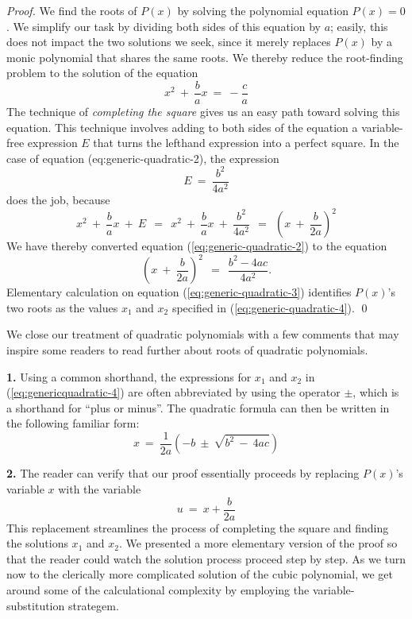 \begin{proof}
We find the roots of $P(x)$ by solving the polynomial equation $P(x) = 0$.  We simplify our task by dividing both sides of this equation by $a$; easily, this does not impact the two solutions we seek, since it merely replaces $P(x)$ by a monic polynomial that shares the same roots.  We thereby reduce the root-finding problem to the solution of the equation
\begin{equation}
\label{eq:generic-quadratic-2}
x^2 \ + \ \frac{b}{a} x \ = \ - \frac{c}{a}
\end{equation}
The technique of {\it completing the square} gives us an easy path toward solving this equation.  This technique involves adding to both sides of the equation a variable-free expression $E$ that turns the lefthand expression into a perfect square.  In the case of equation ({eq:generic-quadratic-2}), the expression
\[ E \ = \ \frac{b^2}{4a^2} \]
does the job, because
\[
x^2 \ + \ \frac{b}{a} x \ + \ E \ \ = \ \
x^2 \ + \ \frac{b}{a} x \ + \ \frac{b^2}{4a^2}
   \ \ = \ \ \left( x \ + \ \frac{b}{2a} \right)^2
\]
We have thereby converted equation (\ref{eq:generic-quadratic-2}) to
the equation
\begin{equation}
\label{eq:generic-quadratic-3}
\left( x \ + \ \frac{b}{2a} \right)^2
 \ \ = \ \ \frac{b^2 - 4ac}{4a^2}.
\end{equation}
Elementary calculation on equation (\ref{eq:generic-quadratic-3}) identifies $P(x)$'s two roots as the values $x_1$ and $x_2$ specified in (\ref{eq:generic-quadratic-4}).  \qed
\end{proof}

\bigskip

\noindent
We close our treatment of quadratic polynomials with a few comments that may inspire some readers to read further about roots of quadratic polynomials.


{\bf 1.}
Using a common shorthand, the expressions for $x_1$ and $x_2$ in (\ref{eq:genericquadratic-4}) are often abbreviated by using the operator $\pm$, which is a shorthand for ``plus or minus''.  The quadratic formula can then be written in the following familiar form:
\[
x \ = \  \frac{1}{2a} \left( -b \ \pm \ \sqrt{b^2 \ - \ 4ac} \right)
\]

\smallskip

{\bf 2.}
The reader can verify that our proof essentially proceeds by replacing $P(x)$'s variable $x$ with the variable
\[ u \ = \ x + \frac{b}{2a} \]
This replacement streamlines the process of completing the square and finding the solutions $x_1$ and $x_2$.  We presented a more elementary version of the proof so that the reader could watch the solution process proceed step by step.  As we turn now to the clerically more complicated solution of the cubic polynomial, we get around some of the calculational complexity by employing the variable-substitution strategem.

